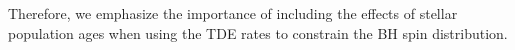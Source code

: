 \documentclass[useAMS,usenatbib]{mn2e}
\def\msun{M_{\rm \odot}}
\def\mBH{M_{\rm BH}}
\def\GammaTDE{\Gamma_{\rm TDE}}
\def\fTDE{f_{\rm TDE}}
\def\tage{t_{\rm age}}
\def\Gyr{{\rm Gyr}}
\def\note{\textcolor{magenta}}
\newcommand{\lara}[1]{\left\langle{#1}\right\rangle}
\begin{document}
Therefore, we emphasize the importance of including the effects of stellar population ages when using the TDE rates to constrain the BH spin distribution.




\end{document}
